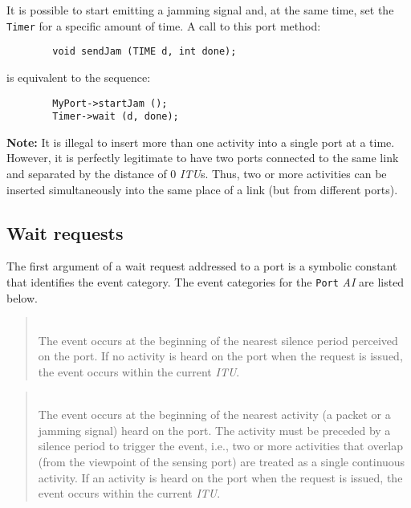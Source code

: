 It is possible to start emitting a jamming signal and, at the same time,
set the {\tt Timer} for a specific amount of time.
A call to this port method:
\begin{verbatim}
        void sendJam (TIME d, int done);
\end{verbatim}
is equivalent to the sequence:
\begin{verbatim}
        MyPort->startJam ();
        Timer->wait (d, done);
\end{verbatim}

\noindent
{\bf Note:}
It is illegal to insert more than one activity into a single port at a time.
However, it is perfectly
legitimate to have two ports connected to the same link and
separated by the distance of 0 {\em ITU\/}s.
Thus, two or more activities can be inserted simultaneously into the same
place of a link (but from different ports).

\subsection{Wait requests}
\label{rm_po_wr}

The first argument of a wait request addressed to a port is a symbolic
constant that identifies the event category.
The event categories for the {\tt Port} {\em AI} are listed below.

\medskip

\begin{quote}
\noindent{}\\ \hspace{0in}
The event occurs at the beginning of the nearest silence
period perceived on the port.
If no activity is heard on the port when the request is issued,
the event occurs within the current {\em ITU}.
\end{quote}

\begin{quote}
\noindent{}\\ \hspace{0in}
The event occurs at the beginning of the nearest activity (a packet
or a jamming signal) heard on the port.
The activity must be preceded by a silence period to trigger the event, i.e.,
two or more activities that overlap (from the viewpoint of the sensing
port) are treated as a single continuous activity.
If an activity is heard on the port when the request is issued,
the event occurs within the current {\em ITU}.
\end{quote}

